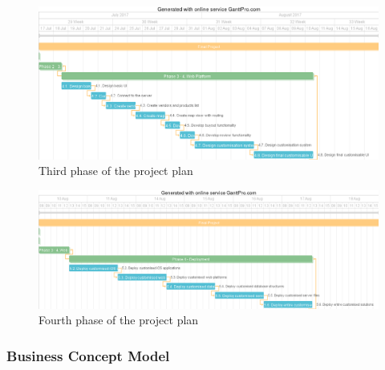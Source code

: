 \begin{figure}[!ht]
\centering
\includegraphics[scale=0.4]{img/phase3.png}
\caption{Third phase of the project plan}
\label{fig:phase3}
\end{figure}

\begin{figure}[!ht]
\centering
\includegraphics[scale=0.4]{img/phase4.png}
\caption{Fourth phase of the project plan}
\label{fig:phase4}
\end{figure}

\subsubsection{Business Concept Model}

